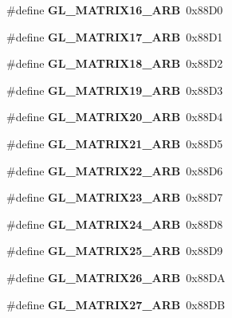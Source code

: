 \begin{DoxyCompactItemize}
\item 
\#define {\bfseries G\+L\+\_\+\+M\+A\+T\+R\+I\+X16\+\_\+\+A\+R\+B}~0x88\+D0\label{_s_d_l__opengl_8h_a381950b3d7a1d8ec6abc2d3fe0229722}

\item 
\#define {\bfseries G\+L\+\_\+\+M\+A\+T\+R\+I\+X17\+\_\+\+A\+R\+B}~0x88\+D1\label{_s_d_l__opengl_8h_a5431ba735f894a8181318afd42698d2a}

\item 
\#define {\bfseries G\+L\+\_\+\+M\+A\+T\+R\+I\+X18\+\_\+\+A\+R\+B}~0x88\+D2\label{_s_d_l__opengl_8h_ae9d347f566d42d4a7552042a4910169f}

\item 
\#define {\bfseries G\+L\+\_\+\+M\+A\+T\+R\+I\+X19\+\_\+\+A\+R\+B}~0x88\+D3\label{_s_d_l__opengl_8h_a89b6cbd127d9ed022da6cd72575ac51c}

\item 
\#define {\bfseries G\+L\+\_\+\+M\+A\+T\+R\+I\+X20\+\_\+\+A\+R\+B}~0x88\+D4\label{_s_d_l__opengl_8h_aa124c3ea6a84df17e6b8cf92ae428068}

\item 
\#define {\bfseries G\+L\+\_\+\+M\+A\+T\+R\+I\+X21\+\_\+\+A\+R\+B}~0x88\+D5\label{_s_d_l__opengl_8h_afef9da61b60774018c7fd025ce2f1feb}

\item 
\#define {\bfseries G\+L\+\_\+\+M\+A\+T\+R\+I\+X22\+\_\+\+A\+R\+B}~0x88\+D6\label{_s_d_l__opengl_8h_a74a53a1aceb6a03c78cff3b642389a2b}

\item 
\#define {\bfseries G\+L\+\_\+\+M\+A\+T\+R\+I\+X23\+\_\+\+A\+R\+B}~0x88\+D7\label{_s_d_l__opengl_8h_afe9d398fddc36679770c52fffd9075cc}

\item 
\#define {\bfseries G\+L\+\_\+\+M\+A\+T\+R\+I\+X24\+\_\+\+A\+R\+B}~0x88\+D8\label{_s_d_l__opengl_8h_ae2d7a57b63a1fecb0f56a71aeb32ca3b}

\item 
\#define {\bfseries G\+L\+\_\+\+M\+A\+T\+R\+I\+X25\+\_\+\+A\+R\+B}~0x88\+D9\label{_s_d_l__opengl_8h_ab4c76b22cd476dfa6d4dd142c099b777}

\item 
\#define {\bfseries G\+L\+\_\+\+M\+A\+T\+R\+I\+X26\+\_\+\+A\+R\+B}~0x88\+D\+A\label{_s_d_l__opengl_8h_a7fd4a96db77788c1080f951d1576ff13}

\item 
\#define {\bfseries G\+L\+\_\+\+M\+A\+T\+R\+I\+X27\+\_\+\+A\+R\+B}~0x88\+D\+B\label{_s_d_l__opengl_8h_ad8cb865d9795665a3252fc948ac3719f}


\end{DoxyCompactItemize}
